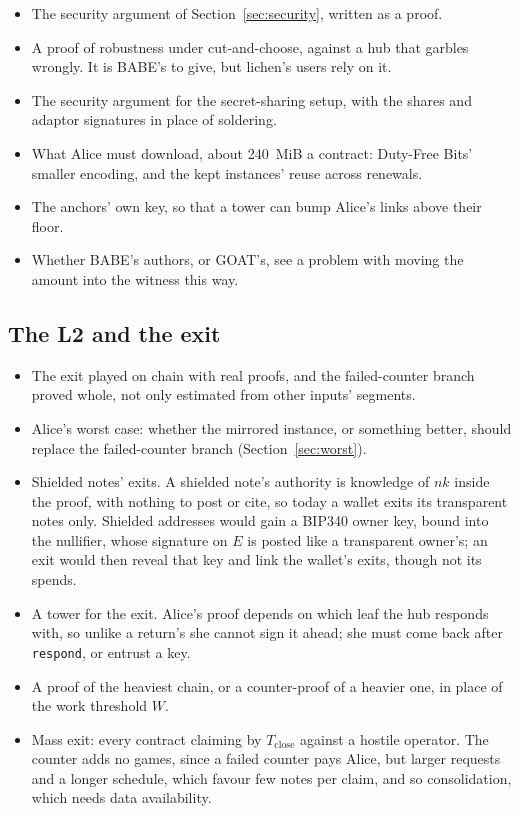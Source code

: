 \documentclass[11pt]{article}
\newcommand{\Tc}{T_{\mathrm{close}}}
\newcommand{\tx}[1]{\texttt{#1}}
\begin{document}
\begin{itemize}[leftmargin=1.5em]
\item The security argument of Section~\ref{sec:security}, written as a
  proof.
\item A proof of robustness under cut-and-choose, against a hub that
  garbles wrongly. It is BABE's to give, but lichen's users rely on it.
\item The security argument for the secret-sharing setup, with the
  shares and adaptor signatures in place of soldering.
\item What Alice must download, about 240~MiB a contract: Duty-Free
  Bits' smaller encoding, and the kept instances' reuse across renewals.
\item The anchors' own key, so that a tower can bump Alice's links above
  their floor.
\item Whether BABE's authors, or GOAT's, see a problem with moving the
  amount into the witness this way.
\end{itemize}

\subsection{The L2 and the exit}

\begin{itemize}[leftmargin=1.5em]
\item The exit played on chain with real proofs, and the failed-counter
  branch proved whole, not only estimated from other inputs' segments.
\item Alice's worst case: whether the mirrored instance, or something
  better, should replace the failed-counter branch
  (Section~\ref{sec:worst}).
\item Shielded notes' exits. A shielded note's authority is knowledge of
  $\mathit{nk}$ inside the proof, with nothing to post or cite, so today
  a wallet exits its transparent notes only. Shielded addresses would
  gain a BIP340 owner key, bound into the nullifier, whose signature on
  $E$ is posted like a transparent owner's; an exit would then reveal
  that key and link the wallet's exits, though not its spends.
\item A tower for the exit. Alice's proof depends on which leaf the hub
  responds with, so unlike a return's she cannot sign it ahead; she
  must come back after \tx{respond}, or entrust a key.
\item A proof of the heaviest chain, or a counter-proof of a heavier one,
  in place of the work threshold $W$.
\item Mass exit: every contract claiming by $\Tc$ against a hostile
  operator. The counter adds no games, since a failed counter pays
  Alice, but larger requests and a longer schedule, which favour few
  notes per claim, and so consolidation, which needs data availability.
\end{itemize}
\end{document}
